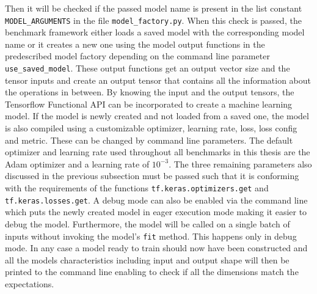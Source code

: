 \documentclass[draft,final]{vutinfth} %
\begin{document}
    Then it will be checked if the passed model name is present in the list constant \texttt{MODEL\_ARGUMENTS} in the file \texttt{model\_factory.py}.
    When this check is passed, the benchmark framework either loads a saved model with the corresponding model name or it creates a new one using the model output functions in the predescribed model factory depending on the command line parameter \texttt{use\_saved\_model}.
    These output functions get an output vector size and the tensor inputs and create an output tensor that contains all the information about the operations in between.
    By knowing the input and the output tensors, the Tensorflow \cite{Tensorflow} Functional API can be incorporated to create a machine learning model.
    If the model is newly created and not loaded from a saved one, the model is also compiled using a customizable optimizer, learning rate, loss, loss config and metric.
    These can be changed by command line parameters.
    The default optimizer and learning rate used throughout all benchmarks in this thesis are the Adam optimizer \cite{Adam} and a learning rate of $10^{-3}$.
    The three remaining parameters also discussed in the previous subsection must be passed such that it is conforming with the requirements of the functions \texttt{tf.keras.optimizers.get} and \texttt{tf.keras.losses.get}.
    A debug mode can also be enabled via the command line which puts the newly created model in eager execution mode making it easier to debug the model. Furthermore, the model will be called on a single batch of inputs without invoking the model's \texttt{fit} method. This happens only in debug mode.
    In any case a model ready to train should now have been constructed and all the models characteristics including input and output shape will then be printed to the command line enabling to check if all the dimensions match the expectations.
\end{document}

